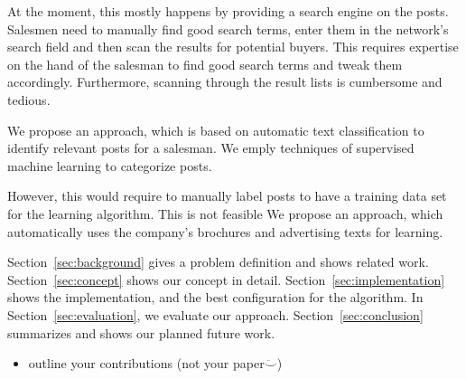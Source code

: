 At the moment, this mostly happens by providing a search engine on the posts.
Salesmen need to manually find good search terms, enter them in the network's search field and then scan the results for potential buyers.
This requires expertise on the hand of the salesman to find good search terms and tweak them accordingly.
Furthermore, scanning through the result lists is cumbersome and tedious.

We propose an approach, which is based on automatic text classification to identify relevant posts for a salesman.
We emply techniques of supervised machine learning to categorize posts.

However, this would require to manually label posts to have a training data set for the learning algorithm.
This is not feasible
We propose an approach, which automatically uses the company's brochures and advertising texts for learning.

Section~\ref{sec:background} gives a problem definition and shows related work.
Section~\ref{sec:concept} shows our concept in detail.
Section~\ref{sec:implementation} shows the implementation, and the best configuration for the algorithm.
In Section~\ref{sec:evaluation}, we evaluate our approach.
Section~\ref{sec:conclusion} summarizes and shows our planned future work.

\begin{itemize}
	\item outline your contributions (not your paper$\ddot\smile$)
\end{itemize}

